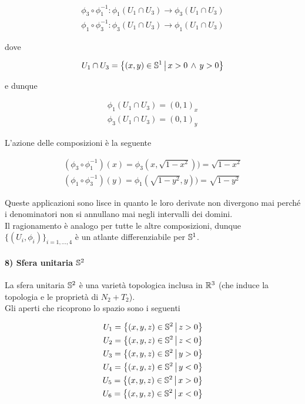 \begin{gather}
	\phi_{3} \circ \phi_{1}^{-1} : \phi_{1}(U_{1} \cap U_{3}) \to \phi_{3}(U_{1} \cap U_{3})\\
	\phi_{1} \circ \phi_{3}^{-1} : \phi_{3}(U_{1} \cap U_{3}) \to \phi_{1}(U_{1} \cap U_{3})
\end{gather}

dove

\begin{equation}
	U_{1} \cap U_{3} = \left\{ (x,y) \in \S^{1} \st x>0 \, \wedge \, y>0  \right\}
\end{equation}

e dunque

\begin{gather}
	\phi_{1}(U_{1} \cap U_{3}) = (0,1)_{x}\\
	\phi_{3}(U_{1} \cap U_{3}) = (0,1)_{y}
\end{gather}

L'azione delle composizioni è la seguente

\begin{gather}
	(\phi_{3} \circ \phi_{1}^{-1}) (x) = \phi_{3} (x,\sqrt{1-x^{2}})) = \sqrt{1-x^{2}}\\
	(\phi_{1} \circ \phi_{3}^{-1}) (y) = \phi_{1} (\sqrt{1-y^{2}},y)) = \sqrt{1-y^{2}}
\end{gather}

Queste applicazioni sono lisce in quanto le loro derivate non divergono mai perché i denominatori non si annullano mai negli intervalli dei domini.\\
Il ragionamento è analogo per tutte le altre composizioni, dunque $ \{(U_{i},\phi_{i})\}_{i=1,\dots,4} $ è un atlante differenziabile per $ \S^{1} $.

\paragraph{8) Sfera unitaria $ \S^{2} $}\label{unit-sph}

La sfera unitaria $ \S^{2} $ è una varietà topologica inclusa in $ \R^{3} $ (che induce la topologia e le proprietà di $ N_{2}+T_{2} $).\\
Gli aperti che ricoprono lo spazio sono i seguenti

\begin{align}
	U_{1} = \left\{ (x,y,z) \in \S^{2} \st z>0 \right\}\\
	U_{2} = \left\{ (x,y,z) \in \S^{2} \st z<0 \right\}\\
	U_{3} = \left\{ (x,y,z) \in \S^{2} \st y>0 \right\}\\
	U_{4} = \left\{ (x,y,z) \in \S^{2} \st y<0 \right\}\\
	U_{5} = \left\{ (x,y,z) \in \S^{2} \st x>0 \right\}\\
	U_{6} = \left\{ (x,y,z) \in \S^{2} \st x<0 \right\}
\end{align}

